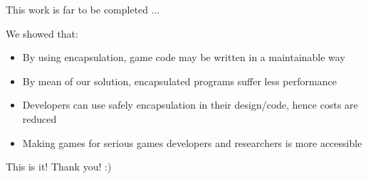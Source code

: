 \documentclass{beamer}
\begin{document}
\begin{slide}{
\item This work is far to be completed ...
\item We showed that:
\begin{itemize}
\item By using encapsulation, game code may be written in a maintainable way
\item By mean of our solution, encapsulated programs suffer less performance
\item Developers can use safely encapsulation in their design/code, hence costs are reduced
\item Making games for serious games developers and researchers is more accessible
\end{itemize}
}\end{slide}

\begin{frame}{This is it!}
\center
\fontsize{18pt}{7.2}\selectfont
Thank you! :)
\end{frame}
\end{document}
